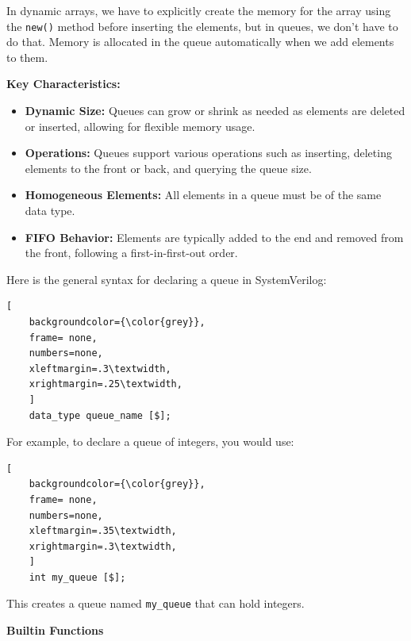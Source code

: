 \documentclass[12pt, a4paper]{article}
\begin{document}
\vspace{0.5em}

In dynamic arrays, we have to explicitly create the memory for the array using the \texttt{new()} method before inserting the elements, but in queues, we don't have to do that. Memory is allocated in the queue automatically when we add elements to them.

\textbf{Key Characteristics:}

\begin{itemize}[nosep]
    \item \textbf{Dynamic Size:} Queues can grow or shrink as needed as elements are deleted or inserted, allowing for flexible memory usage.

    \item \textbf{Operations:} Queues support various operations such as inserting, deleting elements to the front or back, and  querying the queue size.

    \item \textbf{Homogeneous Elements:} All elements in a queue must be of the same data type.
    \item \textbf{FIFO Behavior:} Elements are typically added to the end and removed from the front, following a first-in-first-out order.
\end{itemize}

Here is the general syntax for declaring a queue in SystemVerilog:
\begin{lstlisting}[
    backgroundcolor={\color{grey}},
    frame= none,
    numbers=none,
    xleftmargin=.3\textwidth,
    xrightmargin=.25\textwidth, 
    ]
    data_type queue_name [$];
\end{lstlisting}

For example, to declare a queue of integers, you would use:
\begin{lstlisting}[
    backgroundcolor={\color{grey}},
    frame= none,
    numbers=none,
    xleftmargin=.35\textwidth,
    xrightmargin=.3\textwidth, 
    ]
    int my_queue [$];
\end{lstlisting}
This creates a queue named \texttt{my\_queue} that can hold integers.

\textbf{Builtin Functions}

\vspace{0.2em}
\end{document}
